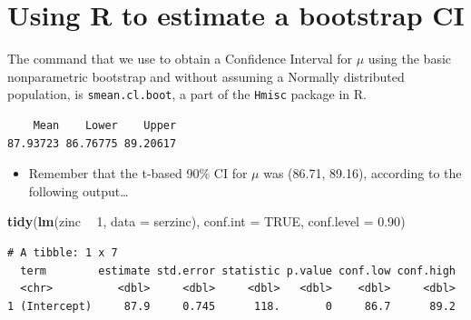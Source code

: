 \documentclass[
]{book}
\newenvironment{Shaded}{\begin{snugshade}}{\end{snugshade}}
\newcommand{\DataTypeTok}[1]{\textcolor[rgb]{0.13,0.29,0.53}{#1}}
\newcommand{\DecValTok}[1]{\textcolor[rgb]{0.00,0.00,0.81}{#1}}
\newcommand{\FloatTok}[1]{\textcolor[rgb]{0.00,0.00,0.81}{#1}}
\newcommand{\KeywordTok}[1]{\textcolor[rgb]{0.13,0.29,0.53}{\textbf{#1}}}
\newcommand{\NormalTok}[1]{#1}
\newcommand{\OperatorTok}[1]{\textcolor[rgb]{0.81,0.36,0.00}{\textbf{#1}}}
\newcommand{\OtherTok}[1]{\textcolor[rgb]{0.56,0.35,0.01}{#1}}
\newcommand{\StringTok}[1]{\textcolor[rgb]{0.31,0.60,0.02}{#1}}
\providecommand{\tightlist}{%
  \setlength{\itemsep}{0pt}\setlength{\parskip}{0pt}}
\begin{document}
\hypertarget{using-r-to-estimate-a-bootstrap-ci}{%
\section{Using R to estimate a bootstrap CI}\label{using-r-to-estimate-a-bootstrap-ci}}

The command that we use to obtain a Confidence Interval for \(\mu\) using the basic nonparametric bootstrap and without assuming a Normally distributed population, is \texttt{smean.cl.boot}, a part of the \texttt{Hmisc} package in R.

\begin{Shaded}
\end{Shaded}

\begin{verbatim}
    Mean    Lower    Upper 
87.93723 86.76775 89.20617 
\end{verbatim}

\begin{itemize}
\tightlist
\item
  Remember that the t-based 90\% CI for \(\mu\) was (86.71, 89.16), according to the following output\ldots{}
\end{itemize}

\begin{Shaded}
\begin{Highlighting}[]
\KeywordTok{tidy}\NormalTok{(}\KeywordTok{lm}\NormalTok{(zinc }\OperatorTok{~}\StringTok{ }\DecValTok{1}\NormalTok{, }\DataTypeTok{data =}\NormalTok{ serzinc), }\DataTypeTok{conf.int =} \OtherTok{TRUE}\NormalTok{, }\DataTypeTok{conf.level =} \FloatTok{0.90}\NormalTok{)}
\end{Highlighting}
\end{Shaded}

\begin{verbatim}
# A tibble: 1 x 7
  term        estimate std.error statistic p.value conf.low conf.high
  <chr>          <dbl>     <dbl>     <dbl>   <dbl>    <dbl>     <dbl>
1 (Intercept)     87.9     0.745      118.       0     86.7      89.2
\end{verbatim}
\end{document}
